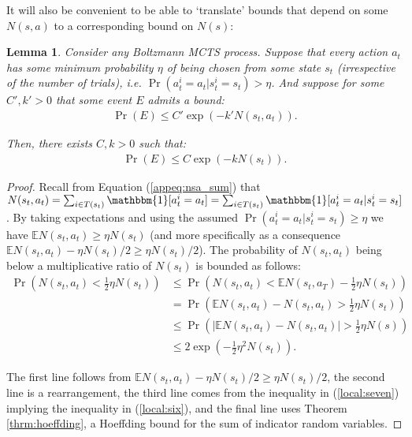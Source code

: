 \documentclass{article}
\newcommand{\bb}[1]{\mathbb{#1}}
\newcommand{\one}{\mathbbm{1}}
\theoremstyle{plain}
\newtheorem{lemma}[theorem]{Lemma}
\begin{document}
\begin{appendices}
    
    
        It will also be convenient to be able to `translate' bounds that depend on some $N(s,a)$ to a corresponding bound on $N(s)$:
        \begin{lemma} \label{lem:sa_to_s}
            Consider any Boltzmann MCTS process. Suppose that every action $a_t$ has some minimum probability $\eta$ of being chosen from some state $s_t$ (irrespective of the number of trials), i.e. $\Pr(a^i_t=a_t|s^i_t=s_t)>\eta$. And suppose for some $C',k'>0$ that some event $E$ admits a bound:
            \begin{align}
                \Pr(E) \leq C'\exp(-k'N(s_t,a_t)). \label{eq:sa_to_s_assume_bound}
            \end{align}
            
            Then, there exists $C,k>0$ such that:
            \begin{align}
                \Pr(E) \leq C\exp(-k N(s_t)). 
            \end{align}
        \end{lemma}
        
        \begin{proof}
            Recall from Equation (\ref{appeq:nsa_sum}) that $N(s_t,a_t)=\sum_{i\in T(s_t)} \one[a^i_t=a_t] = \sum_{i\in T(s_t)} \one[a^i_t=a_t | s^i_t=s_t]$. By taking expectations and using the assumed $\Pr(a^i_t=a_t|s^i_t=s_t)\geq\eta$ we have $\bb{E}N(s_t,a_t) \geq \eta N(s_t)$ (and more specifically as a consequence $\bb{E}N(s_t,a_t) - \eta N(s_t)/2 \geq \eta N(s_t)/2$). The probability of $N(s_t,a_t)$ being below a multiplicative ratio of $N(s_t)$ is bounded as follows:
            \begin{align}
                \Pr\left(N(s_t,a_t) < \frac{1}{2}\eta N(s_t)\right) 
                    &\leq \Pr\left(N(s_t,a_t) < \bb{E}N(s_t,a_T) - \frac{1}{2}\eta N(s_t)\right) \\
                    &= \Pr\left(\bb{E}N(s_t,a_t) - N(s_t,a_t) > \frac{1}{2}\eta N(s_t)\right) \label{local:seven} \\
                    &\leq \Pr\left(|\bb{E}N(s_t,a_t) - N(s_t,a_t)| > \frac{1}{2}\eta N(s)\right) \label{local:six} \\
                    &\leq 2\exp\left(-\frac{1}{2}\eta^2N(s_t)\right). \label{eq:bound_nsa}
            \end{align}
            
            The first line follows from $\bb{E}N(s_t,a_t) - \eta N(s_t)/2 \geq \eta N(s_t)/2$, the second line is a rearrangement, the third line comes from the inequality in (\ref{local:seven}) implying the inequality in (\ref{local:six}), and the final line uses Theorem \ref{thrm:hoeffding}, a Hoeffding bound for the sum of indicator random variables. 
            

\end{proof}
\end{appendices}
\end{document}
